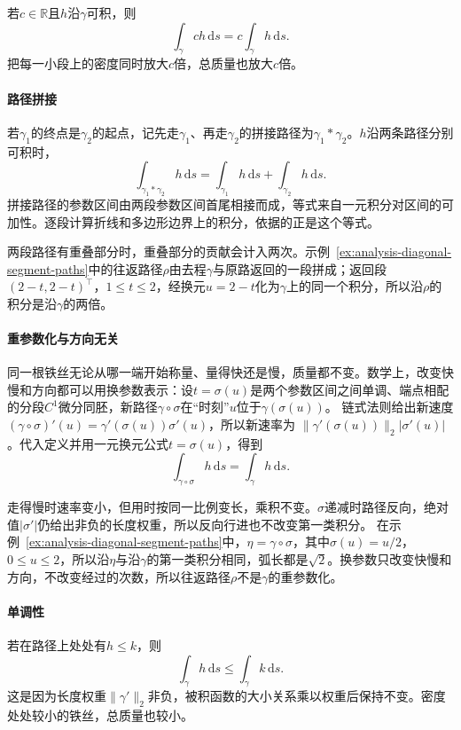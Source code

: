 若$c\in\mathbb R$且$h$沿$\gamma$可积，则
\[
 \int_\gamma ch\,\mathrm ds=c\int_\gamma h\,\mathrm ds.
\]
把每一小段上的密度同时放大$c$倍，总质量也放大$c$倍。

\paragraph{路径拼接}

若$\gamma_1$的终点是$\gamma_2$的起点，记先走$\gamma_1$、再走$\gamma_2$的拼接路径为$\gamma_1*\gamma_2$。$h$沿两条路径分别可积时，
\[
 \int_{\gamma_1*\gamma_2}h\,\mathrm ds
 =\int_{\gamma_1}h\,\mathrm ds+\int_{\gamma_2}h\,\mathrm ds.
\]
拼接路径的参数区间由两段参数区间首尾相接而成，等式来自一元积分对区间的可加性。逐段计算折线和多边形边界上的积分，依据的正是这个等式。

两段路径有重叠部分时，重叠部分的贡献会计入两次。示例~\ref{ex:analysis-diagonal-segment-paths}中的往返路径$\rho$由去程$\gamma$与原路返回的一段拼成；返回段$(2-t,2-t)^\top$，$1\leq t\leq2$，经换元$u=2-t$化为$\gamma$上的同一个积分，所以沿$\rho$的积分是沿$\gamma$的两倍。

\paragraph{重参数化与方向无关}

同一根铁丝无论从哪一端开始称量、量得快还是慢，质量都不变。数学上，改变快慢和方向都可以用换参数表示：设$t=\sigma(u)$是两个参数区间之间单调、端点相配的分段$C^1$微分同胚，新路径$\gamma\circ\sigma$在“时刻”$u$位于$\gamma(\sigma(u))$。
链式法则给出新速度$(\gamma\circ\sigma)'(u)=\gamma'(\sigma(u))\sigma'(u)$，所以新速率为
$\lVert\gamma'(\sigma(u))\rVert_2|\sigma'(u)|$。代入定义并用一元换元公式$t=\sigma(u)$，得到
\[
 \int_{\gamma\circ\sigma}h\,\mathrm ds=\int_\gamma h\,\mathrm ds.
\]

走得慢时速率变小，但用时按同一比例变长，乘积不变。$\sigma$递减时路径反向，绝对值$|\sigma'|$仍给出非负的长度权重，所以反向行进也不改变第一类积分。
在示例~\ref{ex:analysis-diagonal-segment-paths}中，$\eta=\gamma\circ\sigma$，其中$\sigma(u)=u/2$，$0\leq u\leq2$，所以沿$\eta$与沿$\gamma$的第一类积分相同，弧长都是$\sqrt2$。换参数只改变快慢和方向，不改变经过的次数，所以往返路径$\rho$不是$\gamma$的重参数化。

\paragraph{单调性}

若在路径上处处有$h\leq k$，则
\[
 \int_\gamma h\,\mathrm ds\leq\int_\gamma k\,\mathrm ds.
\]
这是因为长度权重$\lVert\gamma'\rVert_2$非负，被积函数的大小关系乘以权重后保持不变。密度处处较小的铁丝，总质量也较小。

